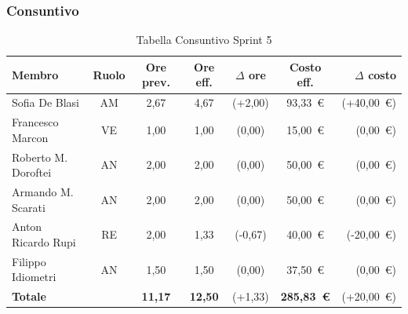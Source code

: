 \subsubsection{Consuntivo}
\begin{table}[H]
    \centering
    \renewcommand{\arraystretch}{1.3}
    \begin{tabularx}{\textwidth}{|X|c|c|c|c|c|r|}
        \hline
        \textbf{Membro} & \textbf{Ruolo} & \textbf{Ore prev.} &
        \textbf{Ore eff.} & \textbf{$\Delta$ ore} &
        \textbf{Costo eff.} & \textbf{$\Delta$ costo} \\
        \hline
        Sofia De Blasi       & AM & 2,67 & 4,67 & {\color{red}(+2,00)}  & 93{,}33~\euro & {\color{red}(+40{,}00~\euro)} \\
        Francesco Marcon     & VE & 1,00 & 1,00 & {\color{green}(0,00)} & 15{,}00~\euro & {\color{green}(0{,}00~\euro)} \\
        Roberto M. Doroftei  & AN & 2,00 & 2,00 & {\color{green}(0,00)} & 50{,}00~\euro & {\color{green}(0{,}00~\euro)} \\
        Armando M. Scarati   & AN & 2,00 & 2,00 & {\color{green}(0,00)} & 50{,}00~\euro & {\color{green}(0{,}00~\euro)} \\
        Anton Ricardo Rupi   & RE & 2,00 & 1,33 & {\color{green}(-0,67)} & 40{,}00~\euro & {\color{green}(-20{,}00~\euro)} \\
        Filippo Idiometri    & AN & 1,50 & 1,50 & {\color{green}(0,00)} & 37{,}50~\euro & {\color{green}(0{,}00~\euro)} \\
        \hline
        \textbf{Totale} & & \textbf{11,17} & \textbf{12,50} & {\color{red}(+1,33)} & \textbf{285{,}83~\euro} & {\color{red}(+20{,}00~\euro)} \\
        \hline
    \end{tabularx}
    \caption{Tabella Consuntivo Sprint 5}
\end{table}

